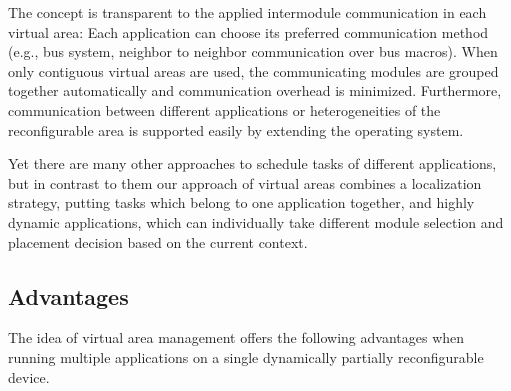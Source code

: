 \documentclass[10pt,journal]{IEEEtran}
\begin{document}
The concept is transparent to the applied intermodule communication in
each virtual area: Each application can choose its preferred
communication method (e.g., bus system, neighbor to neighbor
communication over bus macros). When only contiguous virtual
areas are used, the communicating modules are grouped together
automatically and communication overhead is minimized. Furthermore,
communication between different applications or heterogeneities of the
reconfigurable area is supported easily by extending the operating
system.

Yet there are many other approaches to schedule tasks of different
applications, but in contrast to them our approach of virtual areas
combines a localization strategy, putting tasks which belong to one
application together, and highly dynamic applications, which can
individually take different module selection and placement decision
based on the current context.




\subsection{Advantages}

The idea of virtual area management offers the following advantages
when running multiple applications on a single dynamically partially
reconfigurable device.
\end{document}
